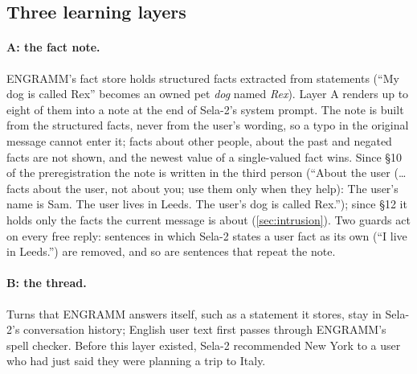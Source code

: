 \documentclass[10pt,twocolumn]{article}
\begin{document}
\subsection{Three learning layers}\label{sec:layers}

\paragraph{A: the fact note.} ENGRAMM's fact store holds structured facts extracted from statements (``My dog is called
Rex'' becomes an owned pet \emph{dog} named \emph{Rex}). Layer A renders up to eight of them into a note at the end of
Sela-2's system prompt. The note is built from the structured facts, never from the user's wording, so a typo in the
original message cannot enter it; facts about other people, about the past and negated facts are not shown, and the
newest value of a single-valued fact wins. Since \S10 of the preregistration the note is written in the third person
(``About the user (\ldots{} facts about the user, not about you; use them only when they help): The user's name is Sam.
The user lives in Leeds. The user's dog is called Rex.''); since \S12 it holds only the facts the current message is
about (\cref{sec:intrusion}). Two guards act on every free reply: sentences in which Sela-2 states a user fact as its
own (``I live in Leeds.'') are removed, and so are sentences that repeat the note.

\paragraph{B: the thread.} Turns that ENGRAMM answers itself, such as a statement it stores, stay in Sela-2's
conversation history; English user text first passes through ENGRAMM's spell checker. Before this layer existed,
Sela-2 recommended New York to a user who had just said they were planning a trip to Italy.
\end{document}
